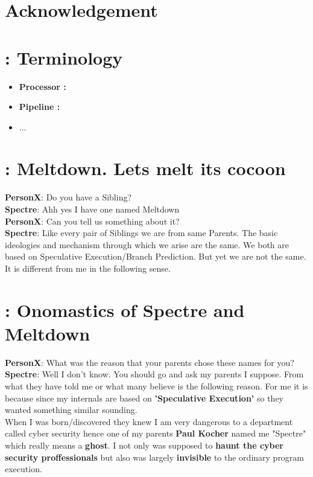 \documentclass[12pt]{article}
\begin{document}
\section{Acknowledgement}
\newpage


\newpage
\begin{appendices}	
	\section{: Terminology}
	\begin{itemize}
		\item \textbf{Processor : }
		\item \textbf{Pipeline : }
		\item ...
	\end{itemize}
	\section{: Meltdown. Lets melt its cocoon}
	
	\textbf{PersonX}: Do you have a Sibling?\\
	
	\textbf{Spectre}: Ahh yes I have one named Meltdown\\
	
	\textbf{PersonX}: Can you tell us something about it?\\
	
	\textbf{Spectre}: Like every pair of Siblings we are from same Parents. The basic ideologies and mechanism through which we arise are the same. We both are based on Speculative Execution/Branch Prediction. But yet we are not the same. It is different from me in the following sense.
	
	\section{:  Onomastics of Spectre and Meltdown \cite{NameOrigin}}
	
	\textbf{PersonX}: What was the reason that your parents chose these names for you?\\
	
	\textbf{Spectre}: Well I don't know. You should go and ask my parents I suppose. From what they have told me or what many believe is the following reason. For me it is because since my internals are based on \textbf{'Speculative Execution'}  so they wanted something similar sounding.\\ When I was born/discovered they knew I am very dangerous to a department called cyber security hence one of my parents \textbf{Paul Kocher} named me "Spectre" which really means a \textbf{ghost}. I not only was supposed to \textbf{haunt the cyber security proffessionals} but also was largely \textbf{invisible} to the ordinary program execution.\\
	

\end{appendices}
\end{document}
